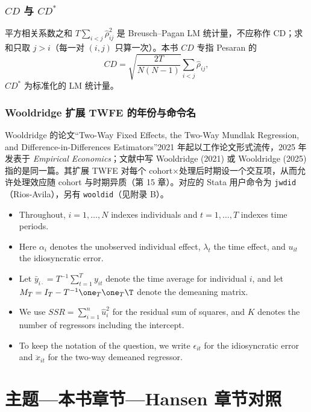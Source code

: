\subsubsection{\texorpdfstring{$CD$ 与 $CD^*$}{CD 与 CD*}}
平方相关系数之和 $T\sum_{i<j}\hat\rho_{ij}^2$ 是 Breusch–Pagan LM 统计量，不应称作 CD；求和只取 $j>i$（每一对 $(i,j)$ 只算一次）。本书 $CD$ 专指 Pesaran 的
\[
CD=\sqrt{\frac{2T}{N(N-1)}}\sum_{i<j}\hat\rho_{ij},
\]
$CD^*$ 为标准化的 LM 统计量。

\subsubsection{Wooldridge 扩展 TWFE 的年份与命令名}
Wooldridge 的论文“Two-Way Fixed Effects, the Two-Way Mundlak Regression, and Difference-in-Differences Estimators”2021 年起以工作论文形式流传，2025 年发表于 \textit{Empirical Economics}；文献中写 Wooldridge (2021) 或 Wooldridge (2025) 指的是同一篇。其扩展 TWFE 对每个 cohort$\times$处理后时期设一个交互项，从而允许处理效应随 cohort 与时期异质（第 15 章）。对应的 Stata 用户命令为 \texttt{jwdid}（Rios-Avila），另有 \texttt{wooldid}（见附录 B）。

\begin{english}
\begin{itemize}
  \item Throughout, $i=1,\dots,N$ indexes individuals and $t=1,\dots,T$ indexes time periods.
  \item Here $\alpha_i$ denotes the unobserved individual effect, $\lambda_t$ the time effect, and $u_{it}$ the idiosyncratic error.
  \item Let $\bar y_{i\cdot}=T^{-1}\sum_{t=1}^T y_{it}$ denote the time average for individual $i$, and let $M_T=I_T-T^{-1}\one_T\one_T\T$ denote the demeaning matrix.
  \item We use $SSR=\sum_{i=1}^n\hat u_i^2$ for the residual sum of squares, and $K$ denotes the number of regressors including the intercept.
  \item To keep the notation of the question, we write $\epsilon_{it}$ for the idiosyncratic error and $\ddot x_{it}$ for the two-way demeaned regressor.
\end{itemize}
\end{english}

\section{主题—本书章节—Hansen 章节对照}\label{sec:UappD-map}


